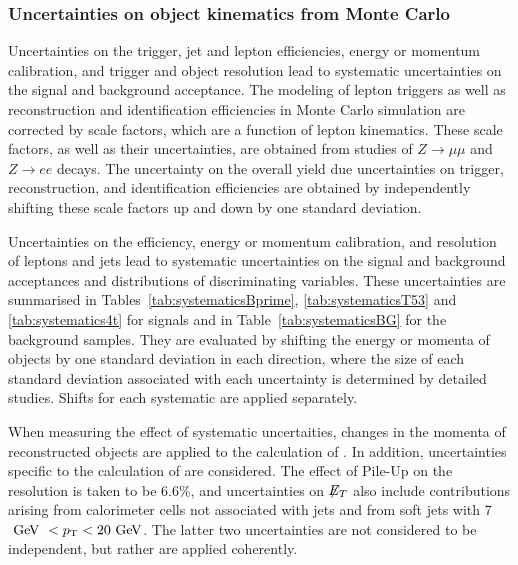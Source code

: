 \subsubsection{Uncertainties on object kinematics from Monte Carlo}
Uncertainties on the trigger, jet and lepton efficiencies, energy or momentum calibration,
and trigger and object resolution lead to systematic uncertainties on the signal and background acceptance.
The modeling of lepton triggers as well as reconstruction and identification efficiencies in
Monte Carlo simulation are corrected by scale factors, which are a function of lepton kinematics.
These scale factors, as well as their uncertainties, are obtained from studies of $Z \rightarrow \mu \mu$ and $Z \rightarrow e e$ decays.
The uncertainty on the overall yield due uncertainties on trigger, reconstruction, and identification efficiencies
are obtained by independently shifting these scale factors up and down by one standard deviation.

Uncertainties on the efficiency, energy or momentum calibration, and resolution of leptons and jets
lead to systematic uncertainties on the signal and background acceptances and distributions of discriminating variables.
These uncertainties are summarised in Tables~\ref{tab:systematicsBprime}, \ref{tab:systematicsT53} and
\ref{tab:systematics4t} for signals and in Table~\ref{tab:systematicsBG} for the background samples.
They are evaluated by shifting the energy or momenta of objects by one standard deviation in each direction,
where the size of each standard deviation associated with each uncertainty is determined by detailed studies.
Shifts for each systematic are applied separately.

When measuring the effect of systematic uncertaities, changes in the momenta of reconstructed objects are applied to the calculation of \met{}.
In addition, uncertainties specific to the calculation of \met{} are considered.
The effect of Pile-Up on the \met{} resolution is taken to be 6.6\%,
and uncertainties on $\not\!\!{E_{T}}{}$ also include contributions arising from calorimeter cells not associated with jets and from soft jets with 7 $\GeV\ < \pt  < 20 \GeV{}$.
The latter two uncertainties are not considered to be independent, but rather are applied coherently.

